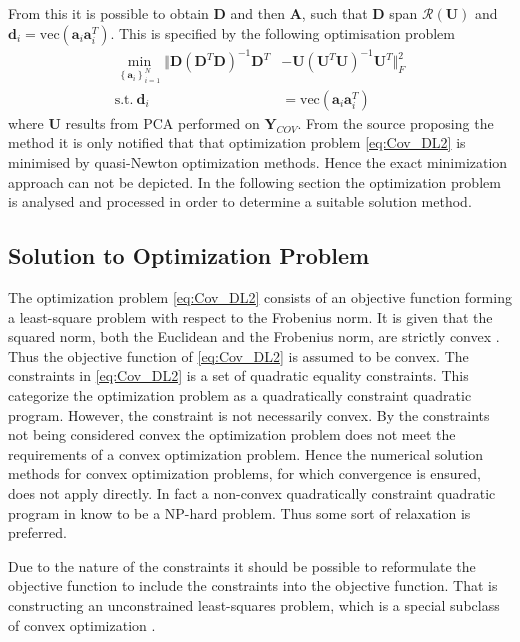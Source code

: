 From this it is possible to obtain $\textbf{D}$ and then $\textbf{A}$, such that $\textbf{D}$ span $\mathcal{R}(\textbf{U})$ and $\textbf{d}_i = \text{vec}(\textbf{a}_i\textbf{a}_i^T)$. This is specified by the following optimisation problem \cite{Balkan2015}
\begin{align}
\min_{\left\{\textbf{a}_i\right\}_{i = 1}^{N}}\Vert  \textbf{D}(\textbf{D}^T\textbf{D})^{-1}\textbf{D}^T &- \textbf{U}(\textbf{U}^T\textbf{U})^{-1}\textbf{U}^T \Vert_{F}^{2} \nonumber \\
\text{s.t.} \ \textbf{d}_i&=\text{vec}(\textbf{a}_i\textbf{a}_i^T)\label{eq:Cov_DL2}
\end{align}      
where $\textbf{U}$ results from PCA performed on $\textbf{Y}_{COV}$.
From the source \cite{Balkan2015} proposing the method it is only notified that that optimization problem \eqref{eq:Cov_DL2} is minimised by quasi-Newton optimization methods. Hence the exact minimization approach can not be depicted.    
In the following section the optimization problem is analysed and processed in order to determine a suitable solution method. 
 
\subsection{Solution to Optimization Problem}
The optimization problem \eqref{eq:Cov_DL2} consists of an objective function forming a least-square problem with respect to the Frobenius norm. It is given that the squared norm, both the Euclidean and the Frobenius norm, are strictly convex \cite[p.173]{norm_optimization}.
Thus the objective function of \eqref{eq:Cov_DL2} is assumed to be convex.
The constraints in \eqref{eq:Cov_DL2} is a set of quadratic equality constraints. 
This categorize the optimization problem as a quadratically constraint quadratic program. 
However, the constraint is not necessarily convex.  
By the constraints not being considered convex the optimization problem does not meet the requirements of a convex optimization problem. Hence the numerical solution methods for convex optimization problems, for which convergence is ensured, does not apply directly. In fact a non-convex quadratically constraint quadratic program in know to be a NP-hard problem\cite{qcqp}. Thus some sort of relaxation is preferred.  

Due to the nature of the constraints it should be possible to reformulate the objective function to include the constraints into the objective function. That is constructing an unconstrained least-squares problem, which is a special subclass of convex optimization \cite{cvxbook}.

